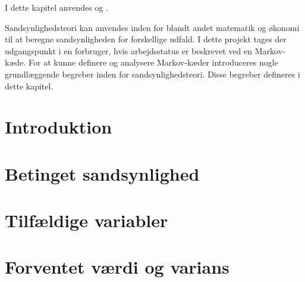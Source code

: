 I dette kapitel anvendes \cite[s. 1-111]{olofsson2005probability} og \cite[s. 6-32]{oxford}. 

Sandsynlighedsteori kan anvendes inden for blandt andet matematik og økonomi til at beregne sandsynligheden for forskellige udfald. I dette projekt tages der udgangspunkt i en forbruger, hvis arbejdsstatus er beskrevet ved en Markov-kæde. 
For at kunne definere og analysere Markov-kæder introduceres nogle grundlæggende begreber inden for sandsynlighedsteori. Disse begreber defineres i dette kapitel. 

\section{Introduktion}


\section{Betinget sandsynlighed}


\section{Tilfældige variabler}


%

\section{Forventet værdi og varians}


%



